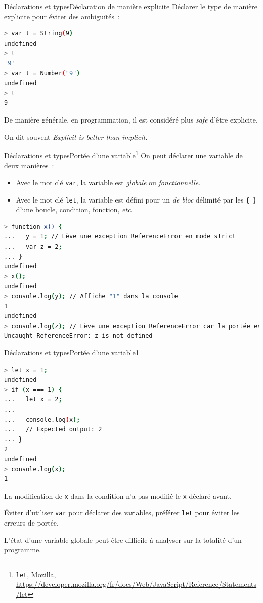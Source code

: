 \documentclass{beamer}
\begin{document}
    \begin{frame}[fragile]{Déclarations et types}{Déclaration de manière explicite}
        Déclarer le type de manière explicite pour éviter des ambiguïtés~:
        \begin{lstlisting}[language=Bash]
> var t = String(9)
undefined
> t
'9'
> var t = Number("9")
undefined
> t
9
        \end{lstlisting}
        \begin{dangercolorbox}
            De manière générale, en programmation, il est considéré plus \textit{safe} d'être explicite.

            On dit souvent \textit{Explicit is better than implicit}.
        \end{dangercolorbox}
    \end{frame}

    \begin{frame}[fragile]{Déclarations et types}{Portée d'une variable\footnote{\label{label}\lstinline{let}, Mozilla, \url{https://developer.mozilla.org/fr/docs/Web/JavaScript/Reference/Statements/let}}}
        On peut déclarer une variable de deux manières~:
        \begin{itemize}
            \item Avec le mot clé \lstinline{var}, la variable est \textit{globale} ou \textit{fonctionnelle}.
            \item Avec le mot clé \lstinline{let}, la variable est défini pour un \textit{de bloc} délimité par les \lstinline[language=Javascript]!{ }! d'une boucle, condition, fonction, \textit{etc}.
        \end{itemize}
        \begin{lstlisting}[language=Bash]
> function x() {
...   y = 1; // Lève une exception ReferenceError en mode strict
...   var z = 2;
... }
undefined
> x();
undefined
> console.log(y); // Affiche "1" dans la console
1
undefined
> console.log(z); // Lève une exception ReferenceError car la portée est fonctionnelle:
Uncaught ReferenceError: z is not defined
        \end{lstlisting}
    \end{frame}

    \begin{frame}[fragile]{Déclarations et types}{Portée d'une variable\cref{label}}
        \begin{lstlisting}[language=Bash]
> let x = 1;
undefined
> if (x === 1) {
...   let x = 2;
...
...   console.log(x);
...   // Expected output: 2
... }
2
undefined
> console.log(x);
1
        \end{lstlisting}
        La modification de \lstinline{x} dans la condition n'a pas modifié le \lstinline{x} déclaré avant.
        \begin{dangercolorbox}
            Éviter d'utiliser \lstinline{var} pour déclarer des variables, préférer \lstinline{let} pour éviter les erreurs de portée.

            L'état d'une variable globale peut être difficile à analyser sur la totalité d'un programme.
        \end{dangercolorbox}
    \end{frame}
\end{document}
